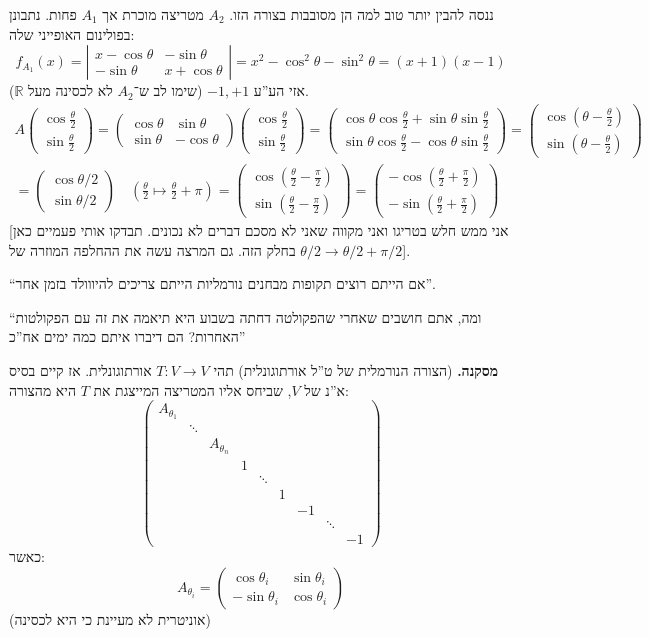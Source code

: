 \documentclass[a4paper]{article}
\newcommand\R     {\mathbb{R}}
\newcommand\ta    {\theta}
\newcommand\co        {\colon}
\newcommand\pms[1]    {\begin{pmatrix}
		#1
\end{pmatrix}}
\newcommand\sof[1]    {\left | #1 \right |}
\newcommand\cl [1]    {\left ( #1 \right )}
\theoremstyle{definition}
\begin{document}
	ננסה להבין יותר טוב למה הן מסובבות בצורה הזו. $A_2$ מטריצה מוכרת אך $A_1$ פחות. נתבונן בפולינום האופייני שלה: 
	\[ f_{A_1}(x) = \sof{\begin{matrix}
			x - \cos\ta & -\sin\ta \\ -\sin\ta & x + \cos\ta
	\end{matrix}} = x^2 - \cos^2 \ta - \sin^2\ta = (x + 1)(x - 1) \]
	אזי הע''ע $-1, +1$ (שימו לב ש־$A_2$ לא לכסינה מעל $\R$). 
	\begin{multline*}
		A\pms{\cos\frac{\ta}{2}\\\sin\frac{\ta}{2}} = \pms{\cos\ta & \sin\ta \\ \sin\ta & -\cos\ta} \pms{\cos\frac{\ta}{2} \\ \sin\frac{\ta}{2}} = \pms{\cos \ta \cos \frac{\ta}{2} + \sin\ta \sin\frac{\ta}{2} \\ \sin\ta\cos\frac{\ta}{2} - \cos\ta\sin\frac{\ta}{2}} = \pms{\cos\cl{\ta - \frac{\ta}{2}} \\ \sin\cl{\ta - \frac{\ta}{2}}} \\
		= \pms{\cos\ta/2 \\ \sin\ta/2} \quad \cl{\frac{\ta}{2} \mapsto \frac{\ta}{2} + \pi}
		= \pms{\cos\cl{\frac{\ta}{2} - \frac{\pi}{2}} \\ \sin\cl{\frac{\ta}{2} - \frac{\pi}{2}}} = \pms{-\cos\cl{\frac{\ta}{2} + \frac{\pi}{2}} \\ -\sin\cl{\frac{\ta}{2} + \frac{\pi}{2}}} 
	\end{multline*}
	[אני ממש חלש בטריגו ואני מקווה שאני לא מסכם דברים לא נכונים. תבדקו אותי פעמיים כאן בחלק הזה. גם המרצה עשה את ההחלפה המוזרה של $\ta/2 \to \ta/2 + \pi/2$]. 
	
	``אם הייתם רוצים תקופות מבחנים נורמליות הייתם צריכים להיווולד בזמן אחר''. 
	
	``ומה, אתם חושבים שאחרי שהפקולטה דחתה בשבוע היא תיאמה את זה עם הפקולטות האחרות? הם דיברו איתם כמה ימים אח''כ''
	
	\textbf{מסקנה. }(הצורה הנורמלית של ט''ל אורתוגונלית) תהי $T \co V \to V$ אורתוגונלית. אז קיים בסיס א''נ של $V$, שביחס אליו המטריצה המייצגת את $T$ היא מהצורה: 
	\[ \pms{A_{\ta_1} \\ &\ddots \\ &&A_{\ta_n} \\ &&& 1 \\ &&&&\ddots \\ &&&&&1 \\ &&&&&&-1 \\ &&&&&&& \ddots \\ &&&&&&&&-1} \]
	כאשר: 
	\[ A_{\ta_i} = \pms{\cos \ta_i & \sin \ta_i \\ -\sin \ta_i & \cos \ta_i} \]
	(אוניטרית לא מעיינת כי היא לכסינה)
	
\end{document}
